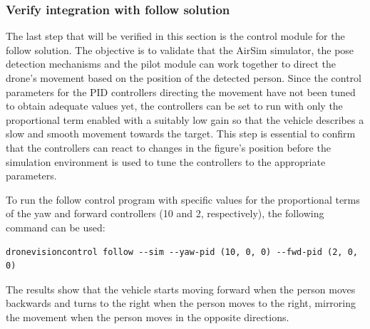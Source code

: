 \subsubsection{Verify integration with follow solution}

The last step that will be verified in this section is the control module for the follow solution. The objective is to validate that the AirSim simulator, the pose detection mechanisms and the pilot module can work together to direct the drone's movement based on the position of the detected person. Since the control parameters for the PID controllers directing the movement have not been tuned to obtain adequate values yet, the controllers can be set to run with only the proportional term enabled with a suitably low gain so that the vehicle describes a slow and smooth movement towards the target. This step is essential to confirm that the controllers can react to changes in the figure's position before the simulation environment is used to tune the controllers to the appropriate parameters.

To run the follow control program with specific values for the proportional terms of the yaw and forward controllers (10 and 2, respectively), the following command can be used:

\begin{verbatim}
dronevisioncontrol follow --sim --yaw-pid (10, 0, 0) --fwd-pid (2, 0, 0)
\end{verbatim}

The results show that the vehicle starts moving forward when the person moves backwards and turns to the right when the person moves to the right, mirroring the movement when the person moves in the opposite directions.

